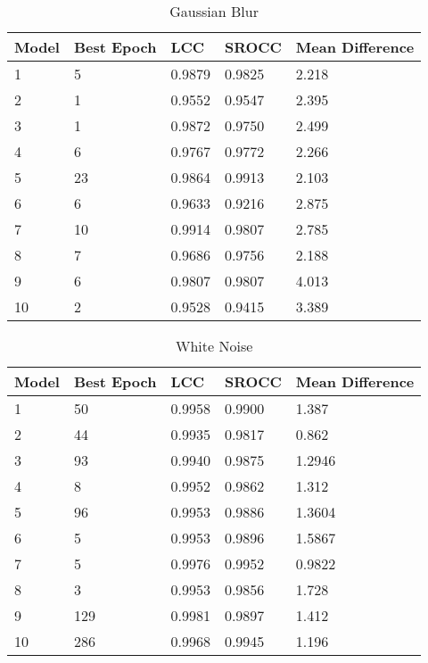 \begin{table}[h]
\centering
\caption{Gaussian Blur}
\label{my-label}
\begin{tabular}{|l|l|l|l|l|}
\hline
Model & Best Epoch & LCC    & SROCC  & Mean Difference \\ \hline
1     & 5          & 0.9879 & 0.9825 & 2.218           \\ \hline
2     & 1          & 0.9552 & 0.9547 & 2.395           \\ \hline
3     & 1          & 0.9872 & 0.9750 & 2.499           \\ \hline
4     & 6          & 0.9767 & 0.9772 & 2.266           \\ \hline
5     & 23         & 0.9864 & 0.9913 & 2.103           \\ \hline
6     & 6          & 0.9633 & 0.9216 & 2.875           \\ \hline
7     & 10         & 0.9914 & 0.9807 & 2.785           \\ \hline
8     & 7          & 0.9686 & 0.9756 & 2.188           \\ \hline
9     & 6          & 0.9807 & 0.9807 & 4.013           \\ \hline
10    & 2          & 0.9528 & 0.9415 & 3.389           \\ \hline
\end{tabular}
\end{table}

\begin{table}[h]
\centering
\caption{White Noise}
\label{my-label}
\begin{tabular}{|l|l|l|l|l|}
\hline
Model & Best Epoch & LCC    & SROCC  & Mean Difference \\ \hline
1     & 50         & 0.9958 & 0.9900 & 1.387           \\ \hline
2     & 44         & 0.9935 & 0.9817 & 0.862           \\ \hline
3     & 93         & 0.9940 & 0.9875 & 1.2946          \\ \hline
4     & 8          & 0.9952 & 0.9862 & 1.312           \\ \hline
5     & 96         & 0.9953 & 0.9886 & 1.3604          \\ \hline
6     & 5          & 0.9953 & 0.9896 & 1.5867          \\ \hline
7     & 5          & 0.9976 & 0.9952 & 0.9822          \\ \hline
8     & 3          & 0.9953 & 0.9856 & 1.728           \\ \hline
9     & 129        & 0.9981 & 0.9897 & 1.412           \\ \hline
10    & 286        & 0.9968 & 0.9945 & 1.196           \\ \hline
\end{tabular}
\end{table}

